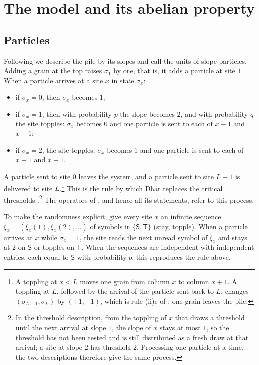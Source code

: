 \documentclass[11pt]{amsart}
\theoremstyle{definition}
\theoremstyle{remark}
\begin{document}
\section{The model and its abelian property}\label{sec:model}

\subsection{Particles}
Following \cite[Sections~3--4]{Dha04} we describe the pile by its slopes and call the units of slope particles. Adding a grain at the top raises $\sigma_1$ by one, that is, it adds a particle at site $1$. When a particle arrives at a site $x$ in state $\sigma_x$:
\begin{itemize}
\item if $\sigma_x=0$, then $\sigma_x$ becomes $1$;
\item if $\sigma_x=1$, then with probability $p$ the slope becomes $2$, and with probability $q$ the site topples: $\sigma_x$ becomes $0$ and one particle is sent to each of $x-1$ and $x+1$;
\item if $\sigma_x=2$, the site topples: $\sigma_x$ becomes $1$ and one particle is sent to each of $x-1$ and $x+1$.
\end{itemize}
A particle sent to site $0$ leaves the system, and a particle sent to site $L+1$ is delivered to site $L$.\footnote{A toppling at $x<L$ moves one grain from column $x$ to column $x+1$. A toppling at $L$, followed by the arrival of the particle sent back to $L$, changes $(\sigma_{L-1},\sigma_L)$ by $(+1,-1)$, which is rule (ii)c of \cite{Dha04}: one grain leaves the pile.} This is the rule by which Dhar replaces the critical thresholds \cite[Section~3]{Dha04}.\footnote{In the threshold description, from the toppling of $x$ that draws a threshold until the next arrival at slope $1$, the slope of $x$ stays at most $1$, so the threshold has not been tested and is still distributed as a fresh draw at that arrival; a site at slope $2$ has threshold $2$. Processing one particle at a time, the two descriptions therefore give the same process.} The operators of \cite{Dha04}, and hence all its statements, refer to this process.

To make the randomness explicit, give every site $x$ an infinite sequence $\xi_x=(\xi_x(1),\xi_x(2),\dots)$ of symbols in $\{\mathsf S,\mathsf T\}$ (stay, topple). When a particle arrives at $x$ while $\sigma_x=1$, the site reads the next unread symbol of $\xi_x$ and stays at $2$ on $\mathsf S$ or topples on $\mathsf T$. When the sequences are independent with independent entries, each equal to $\mathsf S$ with probability $p$, this reproduces the rule above.
\end{document}
